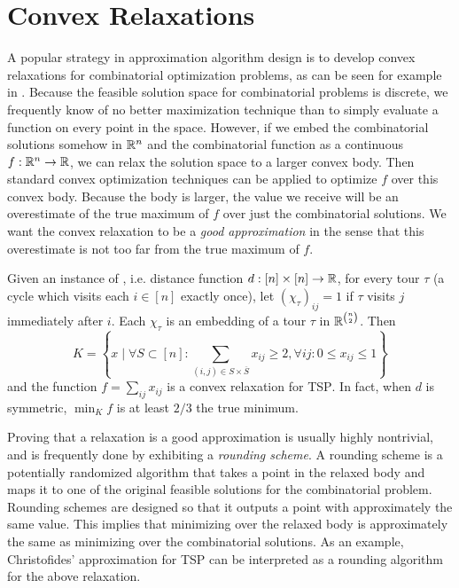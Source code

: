 \section{Convex Relaxations}
A popular strategy in approximation algorithm design is to develop convex relaxations for combinatorial optimization problems, as can be seen for example in \cite{GW95,ARV09,Li13,VY99}. 
Because the feasible solution space for combinatorial problems is discrete, we frequently know of no better maximization technique than to simply evaluate a function on every point in the space. However, if we embed the combinatorial solutions somehow in $\mathbb R^n$ and the combinatorial function as a continuous $f: \mathbb R^n \rightarrow \mathbb R$, we can relax the solution space to a larger convex body. Then standard convex optimization techniques can be applied to optimize $f$ over this convex body. Because the body is larger, the value we receive will be an overestimate of the true maximum of $f$ over just the combinatorial solutions. We want the convex relaxation to be a \emph{good approximation} in the sense that this overestimate is not too far from the true maximum of $f$. 
\begin{example}
Given an instance of , i.e. distance function $d: [n] \times [n] \rightarrow \mathbb R$, for every tour $\tau$ (a cycle which visits each $i \in [n]$ exactly once), let $(\chi_\tau)_{ij} = 1$ if $\tau$ visits $j$ immediately after $i$. Each $\chi_\tau$ is an embedding of a tour $\tau$ in $\mathbb R^{\binom{n}{2}}$. Then 
\[K = \left\{x \mid \forall S \subset [n]: \sum_{(i,j) \in S \times \overline{S}} x_{ij} \geq 2, \forall ij: 0 \leq x_{ij} \leq 1\right\}\]
and the function $f = \sum_{ij} x_{ij}$ is a convex relaxation for \textsc{TSP}. In fact, when $d$ is symmetric, $\min_K f$ is at least $2/3$ the true minimum. 
\end{example}

Proving that a relaxation is a good approximation is usually highly nontrivial, and is frequently done by exhibiting a \emph{rounding scheme}. A rounding scheme is a potentially randomized algorithm that takes a point in the relaxed body and maps it to one of the original feasible solutions for the combinatorial problem. Rounding schemes are designed so that it outputs a point with approximately the same value. This implies that minimizing over the relaxed body is approximately the same as minimizing over the combinatorial solutions. As an example, Christofides' approximation for \textsc{TSP} \cite{Chri76} can be interpreted as a rounding algorithm for the above relaxation.  

